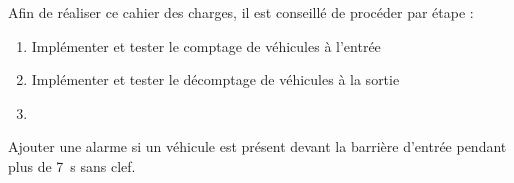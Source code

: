 \documentclass[11pt, multicol]{article}
\begin{document}
\begin{UPSTIactivite}
	Afin de réaliser ce cahier des charges, il est conseillé de procéder par étape :
	\begin{enumerate}
		\item Implémenter et tester le comptage de véhicules à l'entrée
		\item Implémenter et tester le décomptage de véhicules à la sortie
		\item
	\end{enumerate}
\end{UPSTIactivite}

\begin{UPSTIactivite}[][Alarme]
	Ajouter une alarme si un véhicule est présent devant la barrière d'entrée pendant plus de \SI{7}{s} sans clef.
\end{UPSTIactivite}
\end{document}

